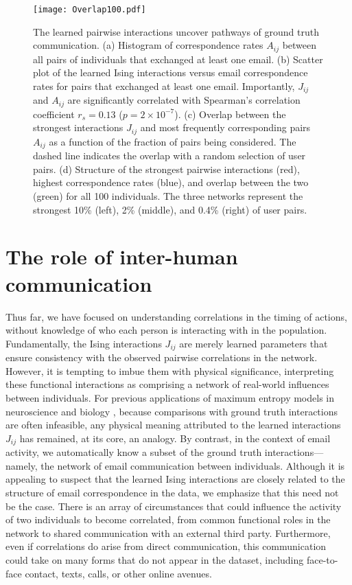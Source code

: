 \documentclass[aps,reprint,superscriptaddress,amsmath,amssymb,longbibliography]{revtex4-1}
\begin{document}
\begin{figure*}
\texttt{[image: Overlap100.pdf]}
\caption{\label{Overlap} The learned pairwise interactions uncover pathways of ground truth communication. (a) Histogram of correspondence rates $A_{ij}$ between all pairs of individuals that exchanged at least one email. (b) Scatter plot of the learned Ising interactions versus email correspondence rates for pairs that exchanged at least one email. Importantly, $J_{ij}$ and $A_{ij}$ are significantly correlated with Spearman's correlation coefficient $r_s=0.13$ ($p=2\times 10^{-7}$). (c) Overlap between the strongest interactions $J_{ij}$ and most frequently corresponding pairs $A_{ij}$ as a function of the fraction of pairs being considered. The dashed line indicates the overlap with a random selection of user pairs. (d) Structure of the strongest pairwise interactions (red), highest correspondence rates (blue), and overlap between the two (green) for all 100 individuals. The three networks represent the strongest 10\% (left), 2\% (middle), and 0.4\% (right) of user pairs.}
\end{figure*}

\section{The role of inter-human communication}

Thus far, we have focused on understanding correlations in the timing of actions, without knowledge of who each person is interacting with in the population. Fundamentally, the Ising interactions $J_{ij}$ are merely learned parameters that ensure consistency with the observed pairwise correlations in the network. However, it is tempting to imbue them with physical significance, interpreting these functional interactions as comprising a network of real-world influences between individuals. For previous applications of maximum entropy models in neuroscience \cite{Schneidman-01, Ganmor-01} and biology \cite{Bialek-01,Weigt-01,Lezon-01}, because comparisons with ground truth interactions are often infeasible, any physical meaning attributed to the learned interactions $J_{ij}$ has remained, at its core, an analogy. By contrast, in the context of email activity, we automatically know a subset of the ground truth interactions---namely, the network of email communication between individuals. Although it is appealing to suspect that the learned Ising interactions are closely related to the structure of email correspondence in the data, we emphasize that this need not be the case. There is an array of circumstances that could influence the activity of two individuals to become correlated, from common functional roles in the network to shared communication with an external third party. Furthermore, even if correlations do arise from direct communication, this communication could take on many forms that do not appear in the dataset, including face-to-face contact, texts, calls, or other online avenues.
\end{document}
